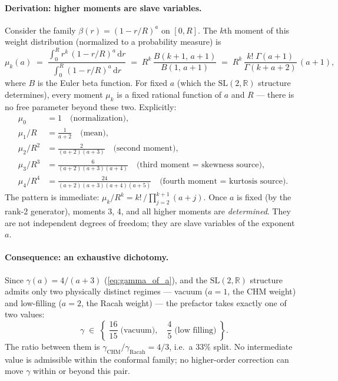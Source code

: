 \documentclass[11pt,letterpaper]{article}
\begin{document}
\paragraph{Derivation: higher moments are slave variables.}
Consider the family $\beta(r) = (1 - r/R)^a$ on $[0, R]$.
The $k$th moment of this weight distribution (normalized to a
probability measure) is
\begin{equation}
  \mu_k(a) \;=\;
  \frac{\int_0^R r^k\,(1-r/R)^a\,\mathrm{d}r}
       {\int_0^R (1-r/R)^a\,\mathrm{d}r}
  \;=\; R^k\,\frac{B(k+1,\,a+1)}{B(1,\,a+1)}
  \;=\; R^k\,\frac{k!\;\Gamma(a+1)}{\Gamma(k+a+2)}\,(a+1),
  \label{eq:moments_beta}
\end{equation}
where $B$ is the Euler beta function. For fixed $a$ (which the
$\mathrm{SL}(2,\mathbb{R})$ structure determines), every moment $\mu_k$
is a fixed rational function of $a$ and $R$ --- there is no free parameter
beyond these two. Explicitly:
\begin{align}
  \mu_0 &= 1 \quad\text{(normalization)}, \label{eq:moment0} \\
  \mu_1/R &= \frac{1}{a+2} \quad\text{(mean)}, \label{eq:moment1} \\
  \mu_2/R^2 &= \frac{2}{(a+2)(a+3)} \quad\text{(second moment)}, \label{eq:moment2} \\
  \mu_3/R^3 &= \frac{6}{(a+2)(a+3)(a+4)} \quad\text{(third moment = skewness source)}, \label{eq:moment3} \\
  \mu_4/R^4 &= \frac{24}{(a+2)(a+3)(a+4)(a+5)} \quad\text{(fourth moment = kurtosis source)}. \label{eq:moment4}
\end{align}
The pattern is immediate: $\mu_k/R^k = k!\,/\prod_{j=2}^{k+1}(a+j)$.
Once $a$ is fixed (by the rank-2 generator), moments 3, 4, and all
higher moments are \emph{determined}. They are not independent degrees
of freedom; they are slave variables of the exponent $a$.

\paragraph{Consequence: an exhaustive dichotomy.}
Since $\gamma(a) = 4/(a+3)$ (\cref{eq:gamma_of_a}), and the
$\mathrm{SL}(2,\mathbb{R})$ structure admits only two physically
distinct regimes --- vacuum ($a = 1$, the CHM weight) and low-filling
($a = 2$, the Racah weight) --- the prefactor takes exactly one of
two values:
\begin{equation}
  \boxed{\;\gamma \;\in\;
    \left\{\;\frac{16}{15}\;\text{(vacuum)},\quad
            \frac{4}{5}\;\text{(low filling)}\;\right\}.}
  \label{eq:dichotomy}
\end{equation}
The ratio between them is $\gamma_{\mathrm{CHM}}/\gamma_{\mathrm{Racah}}
= 4/3$, i.e.\ a $33\%$ split. No intermediate value is admissible within
the conformal family; no higher-order correction can move $\gamma$ within
or beyond this pair.
\end{document}
